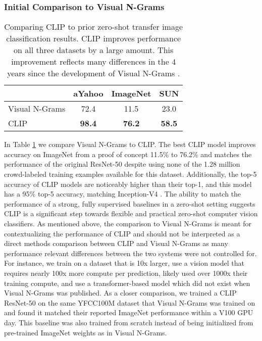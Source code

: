 \documentclass{article}
\begin{document}
\subsubsection{Initial Comparison to Visual N-Grams}

\begin{table}[t]
\vskip 0.15in
\begin{center}
\begin{tabular}{lccc}
\toprule
 & aYahoo & ImageNet & SUN \\
\midrule
Visual N-Grams & 72.4 & 11.5 &  23.0 \\
CLIP & \textbf{98.4} & \textbf{76.2} & \textbf{58.5} \\
\bottomrule
\end{tabular}
\caption{Comparing CLIP to prior zero-shot transfer image classification results. CLIP improves performance on all three datasets by a large amount. This improvement reflects many differences in the 4 years since the development of Visual N-Grams \citep{li2017learning}.}
\label{zeroshot_table}
\end{center}
\vspace{-1em}
\end{table}

In Table \ref{zeroshot_table} we compare Visual N-Grams to CLIP. The best CLIP model improves accuracy on ImageNet from a proof of concept 11.5\% to 76.2\% and matches the performance of the original ResNet-50 despite using none of the 1.28 million crowd-labeled training examples available for this dataset. Additionally, the top-5 accuracy of CLIP models are noticeably higher than their top-1, and this model has a 95\% top-5 accuracy, matching Inception-V4 \cite{szegedy2016inception}. The ability to match the performance of a strong, fully supervised baselines in a zero-shot setting suggests CLIP is a significant step towards flexible and practical zero-shot computer vision classifiers. As mentioned above, the comparison to Visual N-Grams is meant for contextualizing the performance of CLIP and should not be interpreted as a direct methods comparison between CLIP and Visual N-Grams as many performance relevant differences between the two systems were not controlled for. For instance, we train on a dataset that is 10x larger, use a vision model that requires nearly 100x more compute per prediction, likely used over 1000x their training compute, and use a transformer-based model which did not exist when Visual N-Grams was published. As a closer comparison, we trained a CLIP ResNet-50 on the same YFCC100M dataset that Visual N-Grams was trained on and found it matched their reported ImageNet performance within a V100 GPU day. This baseline was also trained from scratch instead of being initialized from pre-trained ImageNet weights as in Visual N-Grams.
\end{document}
